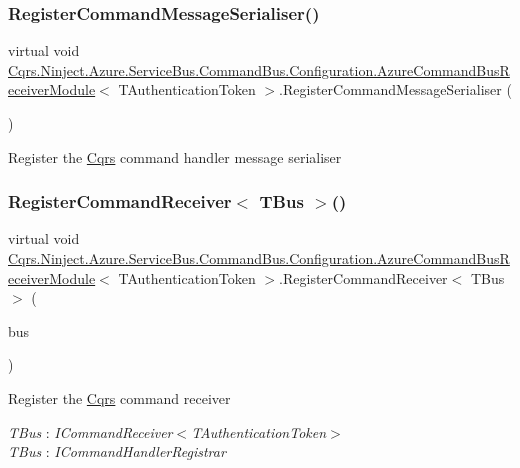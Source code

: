 \subsubsection{\texorpdfstring{Register\+Command\+Message\+Serialiser()}{RegisterCommandMessageSerialiser()}}
{\footnotesize\ttfamily virtual void \hyperlink{classCqrs_1_1Ninject_1_1Azure_1_1ServiceBus_1_1CommandBus_1_1Configuration_1_1AzureCommandBusReceiverModule}{Cqrs.\+Ninject.\+Azure.\+Service\+Bus.\+Command\+Bus.\+Configuration.\+Azure\+Command\+Bus\+Receiver\+Module}$<$ T\+Authentication\+Token $>$.Register\+Command\+Message\+Serialiser (\begin{DoxyParamCaption}{ }\end{DoxyParamCaption})\hspace{0.3cm}{\ttfamily [virtual]}}



Register the \hyperlink{namespaceCqrs}{Cqrs} command handler message serialiser 

\mbox{\label{classCqrs_1_1Ninject_1_1Azure_1_1ServiceBus_1_1CommandBus_1_1Configuration_1_1AzureCommandBusReceiverModule_ad8a7eb743b41cb901444922a3d458695}} 
\subsubsection{\texorpdfstring{Register\+Command\+Receiver$<$ T\+Bus $>$()}{RegisterCommandReceiver< TBus >()}}
{\footnotesize\ttfamily virtual void \hyperlink{classCqrs_1_1Ninject_1_1Azure_1_1ServiceBus_1_1CommandBus_1_1Configuration_1_1AzureCommandBusReceiverModule}{Cqrs.\+Ninject.\+Azure.\+Service\+Bus.\+Command\+Bus.\+Configuration.\+Azure\+Command\+Bus\+Receiver\+Module}$<$ T\+Authentication\+Token $>$.Register\+Command\+Receiver$<$ T\+Bus $>$ (\begin{DoxyParamCaption}\item[{T\+Bus}]{bus }\end{DoxyParamCaption})\hspace{0.3cm}{\ttfamily [virtual]}}



Register the \hyperlink{namespaceCqrs}{Cqrs} command receiver 

\begin{Desc}
\item[Type Constraints]\begin{description}
\item[{\em T\+Bus} : {\em I\+Command\+Receiver$<$T\+Authentication\+Token$>$}]\item[{\em T\+Bus} : {\em I\+Command\+Handler\+Registrar}]\end{description}
\end{Desc}
